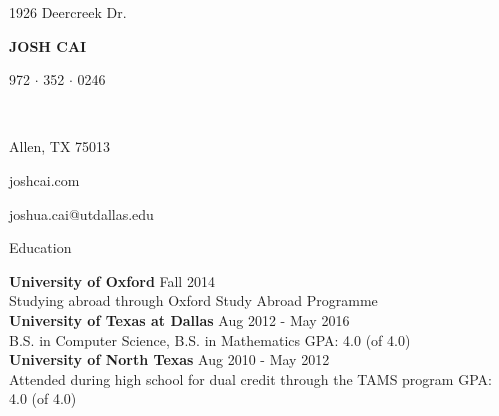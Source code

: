 \documentclass{resume} %
\newcommand\textbox[1]{%
  \parbox{.333\textwidth}{#1}%
}
\begin{document}
\noindent\textbox{1926 Deercreek Dr.\hfill}\textbox{\hfil {\MakeUppercase{\namesize\bf Josh Cai}}\hfil}\textbox{\hfill 972 $\cdot$ 352 $\cdot$ 0246}\\
\noindent\textbox{Allen, TX 75013\hfill}\textbox{\hfil joshcai.com\hfil}\textbox{\hfill joshua.cai@utdallas.edu}\medskip



\begin{rSection}{Education}

{\bf University of Oxford} \hfill Fall 2014 \\
Studying abroad through Oxford Study Abroad Programme\smallskip \\
{\bf University of Texas at Dallas} \hfill Aug 2012 - May 2016 \\
B.S. in Computer Science, B.S. in Mathematics \hfill GPA: 4.0 (of 4.0)\smallskip \\
{\bf University of North Texas} \hfill Aug 2010 - May 2012 \\
Attended during high school for dual credit through the TAMS program \hfill GPA: 4.0 (of 4.0)

\end{rSection}

\end{document}
